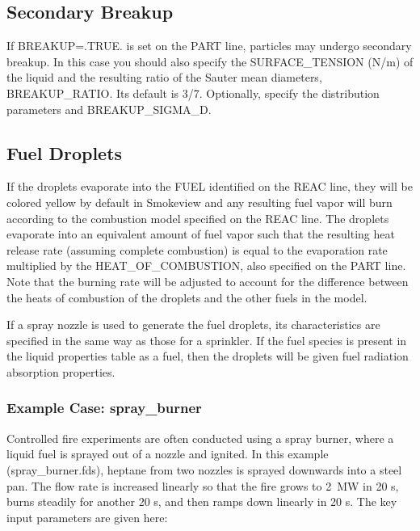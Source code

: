 \documentclass[11pt]{book}
\begin{document}
\subsection{Secondary Breakup}
\label{info:secondary_breakup}

If {\ct BREAKUP=.TRUE.} is set on the {\ct PART} line, particles may undergo secondary breakup.
In this case you should also specify the {\ct SURFACE\_TENSION} (N/m) of the liquid and the resulting ratio of the Sauter mean diameters,
{\ct BREAKUP\_RATIO}. Its default is 3/7. Optionally, specify the distribution parameters  and {\ct BREAKUP\_SIGMA\_D}.


\subsection{Fuel Droplets}
\label{info:fuel_droplets}

If the droplets evaporate into the {\ct FUEL} identified on the {\ct REAC} line, they will be colored yellow by default in Smokeview and any resulting
fuel vapor will burn according to the combustion model specified on the {\ct REAC} line.
The droplets evaporate into an equivalent amount of fuel vapor such that the resulting heat release rate
(assuming complete combustion) is equal to the evaporation rate multiplied by the {\ct HEAT\_OF\_COMBUSTION}, also specified on the {\ct PART} line. Note that the
burning rate will be adjusted to account for the difference between the heats of combustion of the droplets and the other fuels in the model.

If a spray nozzle is used to generate the fuel droplets, its characteristics are specified
in the same way as those for a sprinkler.  If the fuel species is present in the liquid properties table as a fuel, then the droplets will be given fuel radiation absorption properties.

\subsubsection{Example Case: spray\_burner}

Controlled fire experiments are often conducted using a spray burner,
where a liquid fuel is sprayed out of a nozzle and ignited. In this
example ({\ct spray\_burner.fds}), heptane from two nozzles is
sprayed downwards into a steel pan.  The flow rate is increased
linearly so that the fire grows to 2~MW in 20 s, burns steadily for
another 20 s, and then ramps down linearly in 20 s. The key input
parameters are given here:
\end{document}
